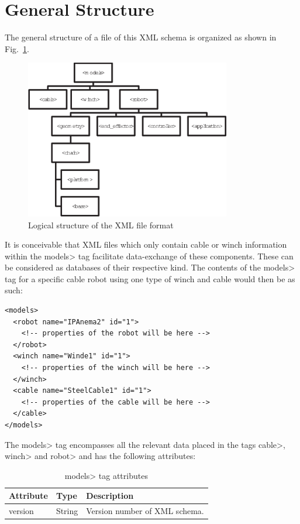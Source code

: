 \section{General Structure}
The general structure of a file of this XML schema is organized as
shown in Fig.~\ref{fig:XmlFileFormatStructure}.
\begin{figure}[tb]
  \centering
  \includegraphics[width=0.8\textwidth]{XmlFileFormatStructure.eps}
  \caption{Logical structure of the XML file format}
  \label{fig:XmlFileFormatStructure}
\end{figure}
It is conceivable that XML files which only contain cable or winch information
within the \<models> tag facilitate data-exchange of these components. These
can be considered as databases of their respective kind. The contents of the
\<models> tag for a specific cable robot using one type of winch and cable
would then be as such:
\begin{verbatim}
<models>
  <robot name="IPAnema2" id="1">
    <!-- properties of the robot will be here -->
  </robot>
  <winch name="Winde1" id="1">
    <!-- properties of the winch will be here -->
  </winch>
  <cable name="SteelCable1" id="1">
    <!-- properties of the cable will be here -->
  </cable>
</models>
\end{verbatim}

The \<models> tag encompasses all the relevant data placed in the tags
\<cable>, \<winch> and \<robot> and has the following attributes:

\begin{table}
  \centering
  \caption{\<models> tag attributes}
  \label{tab:XmlModelTag}
  \begin{tabular}{p{}p{}p{}}
    \hline\hline
    Attribute & Type & Description \\
    \hline
    version & String & Version number of XML schema.\\
    \hline\hline
  \end{tabular}
\end{table}

